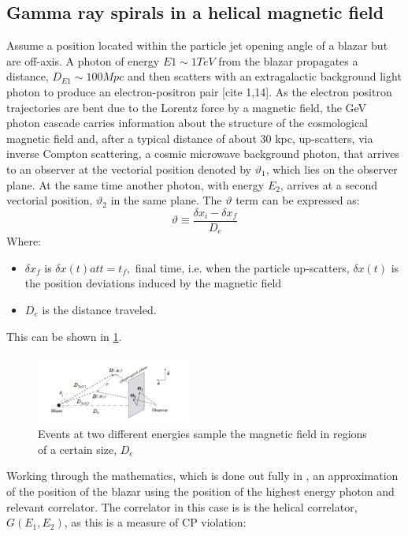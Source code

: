 \subsection{Gamma ray spirals in a helical magnetic field}
Assume a position located within the particle jet opening angle of a blazar but are off-axis.  A photon of energy $E1 \sim 1TeV$ from the blazar propagates a distance, $D_{E1} \sim 100 Mpc$ and then scatters with an extragalactic background light photon to produce an electron-positron pair [cite 1,14]. As the electron positron trajectories are bent due to the Lorentz force by a magnetic field, the GeV photon cascade carries information about the structure of the cosmological magnetic field and, after a typical distance of about 30 kpc, up-scatters, via inverse Compton scattering, a cosmic microwave background photon, that arrives to an observer at the vectorial position denoted by $\vartheta_{1}$, which lies on the observer plane. At the same time another photon, with energy $E_{2}$, arrives at a second vectorial position, $\vartheta_{2}$ in the same plane. \cite{2} \cite{4}
The $\vartheta$ term can be expressed as: 
\begin{equation}
\vartheta \equiv \frac{\delta x_{i}-\delta x_{f} }{D_e}
\end{equation}
Where: 
\begin{itemize}
\item $\delta x_{f}$ is $\delta x(t) at t = t_{f},$ final time, i.e. when the particle up-scatters, $\delta x(t)$ is the position deviations induced by the magnetic field \cite{4}
\item $D_{e}$ is the distance traveled.
\end{itemize}
This can be shown in \cref{De}. 
\begin{figure}[hbt!] \label{De}
\begin{center}
\includegraphics[width=0.451\textwidth]{figs/b.png}
\caption{Events at two different energies sample the magnetic field in regions of a certain size, $D_{e}$ \cite{4}}
\end{center}
\end{figure}
Working through the mathematics, which is done out fully in \cite{4}, an approximation of the position of the blazar using the position of the highest energy photon and relevant correlator. The correlator in this case is is the helical correlator, $G(E_{1}, E_{2})$, as this is a measure of CP violation\cite{18}:
